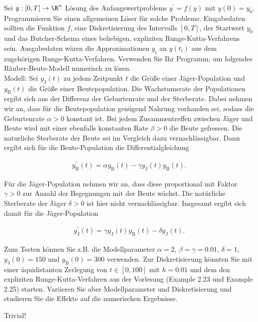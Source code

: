 \begin{exercise}

Sei $y: [0, T] \to \R^n$ Lösung des Anfangswertproblems $y^\prime = f(y)$ mit $y(0) = y_0$.
Programmieren Sie einen allgemeinen Löser für solche Probleme.
Eingabedaten sollten die Funktion $f$, eine Diskretisierung des Intervalls $[0, T]$, der Startwert $y_0$ und das Butcher-Schema eines beliebigen, expliziten Runge-Kutta-Verfahrens sein. Ausgabedaten wären die Approximationen $y_i$ an $y(t_i)$ aus dem zugehörigen Runge-Kutta-Verfahren.
Verwenden Sie Ihr Programm, um folgendes Räuber-Beute-Modell numerisch zu lösen. \\

Modell:
Sei $y_\mathrm{J}(t)$ zu jedem Zeitpunkt $t$ die Größe einer Jäger-Population und $y_\mathrm{B}(t)$ die Größe einer Beutepopulation.
Die Wachstumsrate der Populationen ergibt sich aus der Differenz der Geburtenrate und der Sterberate.
Dabei nehmen wir an, dass für die Beutepopulation genügend Nahrung vorhanden sei, sodass die Geburtenrate $\alpha > 0$ konstant ist.
Bei jedem Zusammentreffen zwischen Jäger und Beute wird mit einer ebenfalls konstanten Rate $\beta > 0$ die Beute gefressen.
Die naturliche Sterberate der Beute sei im Vergleich dazu vernachlässigbar.
Dann ergibt sich für die Beute-Population die Differentialgleichung

\begin{align}
  \label{Beute-Population}
  y_\mathrm{B}^\prime(t)
  =
  \alpha y_\mathrm{B}(t) - \gamma y_\mathrm{J}(t) y_\mathrm{B}(t).
  \tag{1a}
\end{align}

Für die Jäger-Population nehmen wir an, dass diese proportional mit Faktor $\gamma > 0$ zur Anzahl der Begegnungen mit der Beute wächst.
Die natürliche Sterberate der Jäger $\delta > 0$ ist hier nicht vernachlässigbar.
Insgesamt ergibt sich damit für die Jäger-Population

\begin{align}
  \label{Jäger-Population}
  y_\mathrm{J}^\prime(t)
  =
  \gamma y_\mathrm{J}(t) y_\mathrm{B}(t) - \delta y_\mathrm{J}(t).
  \tag{1b}
\end{align}

Zum Testen können Sie z.B. die Modellparameter $\alpha = 2$, $\beta = \gamma = 0.01$, $\delta = 1$, $y_\mathrm{J}(0) = 150$ und $y_\mathrm{B}(0) = 300$ verwenden.
Zur Diskretisierung könnten Sie mit einer äquidistanten Zerlegung von $t \in [0, 100]$ mit $h = 0.01$ und dem den expliziten Runge-Kutta-Verfahren aus der Vorlesung (Example 2.23 und Example 2.25) starten.
Variieren Sie aber Modellparameter und Diskretisierung
und studieren Sie die Effekte auf die numerischen Ergebnisse.

\end{exercise}

\begin{solution}

Trivial!

\end{solution}
